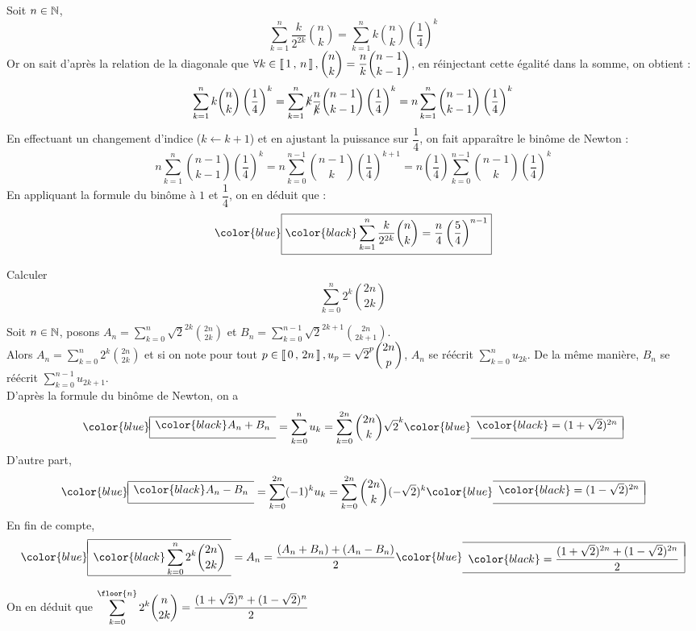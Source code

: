 \documentclass{fancybook}
\newcommand{\lboxed}[1]{{\color{blue}\begin{array}{|l}\hline\\[-2.4ex]{\color{black}#1}\\[1.2ex]\hline\end{array}}}
\newcommand{\rboxed}[1]{{\color{blue}\begin{array}{r|}\hline\\[-2.4ex]{\color{black}#1}\\[1.2ex]\hline\end{array}}}
\newcommand{\lrboxed}[1]{{\color{blue}\boxed{\color{black}#1}}}
\begin{document}
\begin{solution}
Soit $n \in \mathbb{N}$,
\[
\displaystyle\sum\limits_{k=1}^{n} \dfrac{k}{2^{2k}}\binom{n}{k} = \displaystyle\sum\limits_{k=1}^{n}k \binom{n}{k} \left(\dfrac{1}{4}\right)^k
\]
Or on sait d'après la relation de la diagonale que $\forall k \in \left\llbracket \, 1 \, , \, n \, \right\rrbracket, \displaystyle\binom{n}{k} = \dfrac{n}{k}\binom{n-1}{k-1}$, en réinjectant cette égalité dans la somme, on obtient :
\[
\displaystyle\sum\limits_{k=1}^{n}k \binom{n}{k} \left(\dfrac{1}{4}\right)^k
=\displaystyle\sum\limits_{k=1}^{n}\cancel{k} \dfrac{n}{\cancel{k}}\binom{n-1}{k-1} \left(\dfrac{1}{4}\right)^k
=n\displaystyle\sum\limits_{k=1}^{n} \binom{n-1}{k-1} \left(\dfrac{1}{4}\right)^k
\]
En effectuant un changement d'indice ($k \leftarrow k+1$) et en ajustant la puissance sur $\dfrac{1}{4}$, on fait apparaître le binôme de Newton :
\[
n\displaystyle\sum\limits_{k=1}^{n} \binom{n-1}{k-1} \left(\dfrac{1}{4}\right)^k 
= n\displaystyle\sum\limits_{k=0}^{n-1} \binom{n-1}{k} \left(\dfrac{1}{4}\right)^{k+1} =  n\left(\dfrac{1}{4}\right)\displaystyle\sum\limits_{k=0}^{n-1} \binom{n-1}{k} \left(\dfrac{1}{4}\right)^{k}
\]
En appliquant la formule du binôme à $1$ et $\dfrac{1}{4}$, on en déduit que :
\[
\lrboxed{\displaystyle\sum\limits_{k=1}^{n} \dfrac{k}{2^{2k}}\binom{n}{k} =\dfrac{n}{4}\left(\dfrac{5}{4}\right)^{n-1}}
\]
\end{solution}

\begin{exercice}
Calculer 
\[
\displaystyle\sum\limits_{k=0}^{n} 2^k \binom{2n}{2k}
\]
\end{exercice}

\begin{solution}
Soit $n \in \mathbb{N}$, posons $A_n = \displaystyle\sum\limits_{k=0}^{n} \sqrt{2}^{2k} \binom{2n}{2k}$ et $B_n = \displaystyle\sum\limits_{k=0}^{n-1} \sqrt{2}^{2k+1}  \binom{2n}{2k+1}$.\\
Alors $A_n = \displaystyle\sum\limits_{k=0}^{n} 2^k \binom{2n}{2k}$ et si on note pour tout $ p \in \left\llbracket \, 0 \, , \, 2n \, \right\rrbracket, u_p = \sqrt{2}^{p} \displaystyle\binom{2n}{p}$, $A_n$ se réécrit $\displaystyle\sum\limits_{k=0}^{n} u_{2k}$. De la même manière, $B_n$ se réécrit $\displaystyle\sum\limits_{k=0}^{n-1} u_{2k+1}$.\\
D'après la formule du binôme de Newton, on a
\[
\lboxed{A_n + B_n} 
= \displaystyle\sum\limits_{k=0}^{n} u_{k} 
= \displaystyle\sum\limits_{k=0}^{2n}\binom{2n}{k} \sqrt{2}^k 
\rboxed{= (1+\sqrt{2})^{2n}} 
\]
D'autre part,  
\[
\lboxed{A_n - B_n}
= \displaystyle\sum\limits_{k=0}^{2n} (-1)^k u_{k} 
= \displaystyle\sum\limits_{k=0}^{2n} \binom{2n}{k}  (-\sqrt{2})^k 
\rboxed{= (1-\sqrt{2})^{2n}}
\]
En fin de compte,  
\[
\lboxed{\displaystyle\sum\limits_{k=0}^{n} 2^k \binom{2n}{2k}}
= A_n 
= \dfrac{(A_n+B_n) + (A_n - B_n)}{2} 
\rboxed{= \dfrac{(1+\sqrt{2})^{2n}+(1-\sqrt{2})^{2n}}{2}}
\]

On en déduit que \hfil$\displaystyle\sum\limits_{k=0}^{\floor{n}} 2^k \binom{n}{2k} = \dfrac{(1+\sqrt{2})^{n}+(1-\sqrt{2})^{n}}{2}$
\end{solution}
\end{document}
